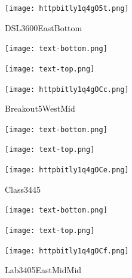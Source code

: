 \documentclass[letterpaper]{article}
\begin{document}
 \begingroup 
 \centerline{\texttt{[image: httpbitly1q4gO5t.png]}} 
 \endgroup 
 \vspace*{\fill} 

 \hfill{\small DSL3600EastBottom} 

  \vspace{0.7in} 
 
 \centerline{\texttt{[image: text-bottom.png]}} 
 
 \pagebreak 
{} 
 \vspace*{\fill} 
 
  \centerline{\texttt{[image: text-top.png]}} 
 
 \vspace{0.5in} 
 
 \begingroup 
 \centerline{\texttt{[image: httpbitly1q4gOCc.png]}} 
 \endgroup 
 \vspace*{\fill} 

 \hfill{\small Breakout5WestMid} 

  \vspace{0.7in} 
 
 \centerline{\texttt{[image: text-bottom.png]}} 
 
 \pagebreak 
{} 
 \vspace*{\fill} 
 
  \centerline{\texttt{[image: text-top.png]}} 
 
 \vspace{0.5in} 
 
 \begingroup 
 \centerline{\texttt{[image: httpbitly1q4gOCe.png]}} 
 \endgroup 
 \vspace*{\fill} 

 \hfill{\small Class3445} 

  \vspace{0.7in} 
 
 \centerline{\texttt{[image: text-bottom.png]}} 
 
 \pagebreak 
{} 
 \vspace*{\fill} 
 
  \centerline{\texttt{[image: text-top.png]}} 
 
 \vspace{0.5in} 
 
 \begingroup 
 \centerline{\texttt{[image: httpbitly1q4gOCf.png]}} 
 \endgroup 
 \vspace*{\fill} 

 \hfill{\small Lab3405EastMidMid} 

  \vspace{0.7in} 
 
\end{document}

